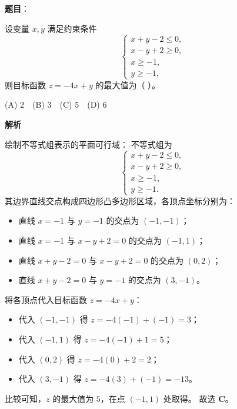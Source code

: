 \begin{answer}

\textbf{题目}：

设变量 $x, y$ 满足约束条件
\nopagebreak[4]
\[
\begin{cases}
x + y - 2 \leqslant 0, \\
x - y + 2 \geqslant 0, \\
x \geqslant -1, \\
y \geqslant -1,
\end{cases}
\]
则目标函数 $z = -4x + y$ 的最大值为（ ）。

(A) $2$　(B) $3$　(C) $5$　(D) $6$

\textbf{解析}

绘制不等式组表示的平面可行域：
不等式组为
\nopagebreak[4]
\[
\begin{cases}
x + y - 2 \leqslant 0, \\
x - y + 2 \geqslant 0, \\
x \geqslant -1, \\
y \geqslant -1.
\end{cases}
\]
其边界直线交点构成四边形凸多边形区域，各顶点坐标分别为：
\begin{itemize}
\item 直线 $x = -1$ 与 $y = -1$ 的交点为 $(-1, -1)$；
\item 直线 $x = -1$ 与 $x - y + 2 = 0$ 的交点为 $(-1, 1)$；
\item 直线 $x + y - 2 = 0$ 与 $x - y + 2 = 0$ 的交点为 $(0, 2)$；
\item 直线 $x + y - 2 = 0$ 与 $y = -1$ 的交点为 $(3, -1)$。
\end{itemize}
将各顶点代入目标函数 $z = -4x + y$：
\begin{itemize}
\item 代入 $(-1, -1)$ 得 $z = -4(-1) + (-1) = 3$；
\item 代入 $(-1, 1)$ 得 $z = -4(-1) + 1 = 5$；
\item 代入 $(0, 2)$ 得 $z = -4(0) + 2 = 2$；
\item 代入 $(3, -1)$ 得 $z = -4(3) + (-1) = -13$。
\end{itemize}
比较可知，$z$ 的最大值为 $5$，在点 $(-1, 1)$ 处取得。
故选 \textbf{C}。


\end{answer}
